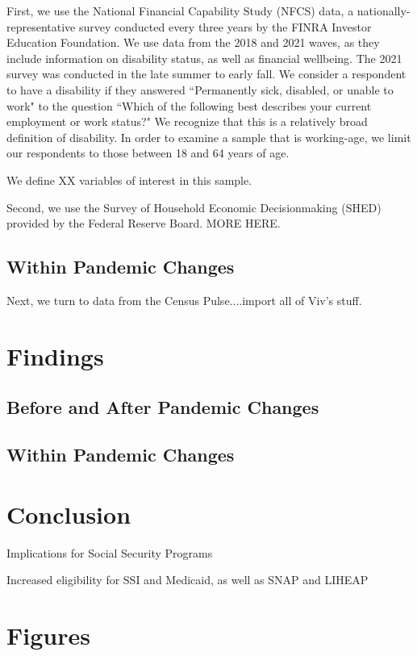 \documentclass[12pt]{article}
\begin{document}
First, we use the National Financial Capability Study (NFCS) data, a nationally-representative survey conducted every three years by the FINRA Investor Education Foundation. We use data from the 2018 and 2021 waves, as they include information on disability status, as well as financial wellbeing. The 2021 survey was conducted in the late summer to early fall. We consider a respondent to have a disability if they answered ``Permanently sick, disabled, or unable to work" to the question ``Which of the following best describes your current employment or work status?" We recognize that this is a relatively broad definition of disability. In order to examine a sample that is working-age, we limit our respondents to those between 18 and 64 years of age. 

We define XX variables of interest in this sample. 


Second, we use the Survey of Household Economic Decisionmaking (SHED) provided by the Federal Reserve Board. MORE HERE. 



\subsection{Within Pandemic Changes}
Next, we turn to data from the Census Pulse....import all of Viv's stuff. 


 

\section{Findings}
\subsection{Before and After Pandemic Changes}

\subsection{Within Pandemic Changes}

 
  

\section{Conclusion}
 
Implications for Social Security Programs
 
Increased eligibility for SSI and Medicaid, as well as SNAP and LIHEAP
 

\section{Figures}
 
\end{document}
